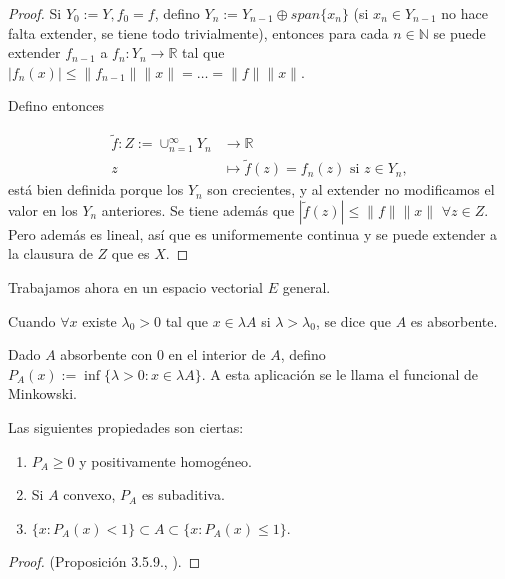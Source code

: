 \begin{proof}
  Si $Y_0:=Y,f_0=f$, defino $Y_n:=Y_{n-1}\oplus span \{x_n\}$ (si $x_n \in
  Y_{n-1}$ no hace falta extender, se tiene todo trivialmente), entonces para
  cada $n\in \mathbb{N}$ se puede extender $f_{n-1}$ a $f_n:Y_n\to \mathbb{R}$
  tal que $|f_n(x)|\le \|f_{n-1}\|\|x\|=\ldots=\|f\|\|x\|$.

  Defino entonces

  \begin{align*}
    \tilde{f}: Z:=\cup_{n=1}^\infty Y_n &\longrightarrow \mathbb{R} \\
    z &\longmapsto \tilde{f}(z) = f_n(z) \text{ si } z\in Y_n
  ,\end{align*}
  está bien definida porque los $Y_n$ son crecientes, y al extender no
  modificamos el valor en los $Y_n$ anteriores. Se tiene además que
  $|\tilde{f}(z)|\le \|f\|\|x\|$ $\forall z\in Z$. Pero además es lineal, así
  que es uniformemente continua y se puede extender a la clausura de $Z$ que es
  $X$.
\end{proof}

Trabajamos ahora en un espacio vectorial $E$ general.

\begin{definition}
  Cuando $\forall x$ existe $\lambda_0>0$ tal que $x\in \lambda A$ si
  $\lambda>\lambda_0$, se dice que $A$ es absorbente.
\end{definition}

\begin{definition}
  Dado $A$ absorbente con $0$ en el interior de $A$, defino $P_A(x):= \inf \{\lambda>0:x\in
  \lambda A\} $. A esta aplicación se le llama el funcional de Minkowski.
\end{definition}

\begin{proposition}
  Las siguientes propiedades son ciertas:
  \begin{enumerate}
    \item $P_A\ge 0$ y positivamente homogéneo.
    \item Si $A$ convexo, $P_A$ es subaditiva.
    \item $\{x:P_A(x)<1\} \subset A \subset \{x:P_A(x)\le 1\}  $.
  \end{enumerate}
\end{proposition}

\begin{proof}
  (Proposición 3.5.9., \cite{cascales2012}).
\end{proof}


